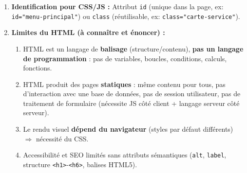 \documentclass[11pt]{article}
\begin{document}
\begin{methode}
\begin{enumerate}
\begin{itemize}
        \end{itemize}
  \item \textbf{Identification pour CSS/JS :} Attribut \texttt{id} (unique dans la page, ex: \texttt{id="menu-principal"}) ou \texttt{class} (réutilisable, ex: \texttt{class="carte-service"}).
  \item \textbf{Limites du HTML (à connaître et énoncer) :}
        \begin{enumerate}
          \item HTML est un langage de \textbf{balisage} (structure/contenu), \textbf{pas un langage de programmation} : pas de variables, boucles, conditions, calculs, fonctions.
          \item HTML produit des pages \textbf{statiques} : même contenu pour tous, pas d'interaction avec une base de données, pas de session utilisateur, pas de traitement de formulaire (nécessite JS côté client + langage serveur côté serveur).
          \item Le rendu visuel \textbf{dépend du navigateur} (styles par défaut différents) $\Rightarrow$ nécessité du CSS.
          \item Accessibilité et SEO limités sans attributs sémantiques (\texttt{alt}, \texttt{label}, structure \texttt{<h1>}-\texttt{<h6>}, balises HTML5).
        \end{enumerate}
\end{enumerate}
\end{methode}
\end{document}
